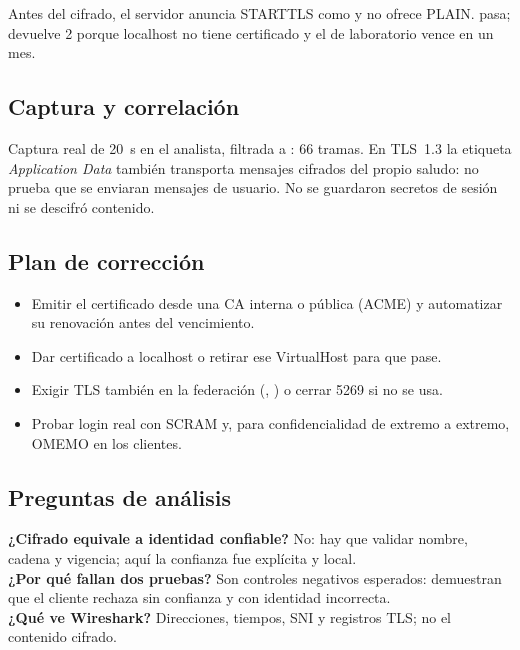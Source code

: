 Antes del cifrado, el servidor anuncia STARTTLS como  y no ofrece PLAIN.  pasa;  devuelve 2 porque localhost no tiene certificado y el de laboratorio vence en un mes.

\subsection{Captura y correlación}
Captura real de 20~s en el analista, filtrada a : 66 tramas.
En TLS~1.3 la etiqueta \emph{Application Data} también transporta mensajes cifrados del propio saludo: no prueba que se enviaran mensajes de usuario. No se guardaron secretos de sesión ni se descifró contenido.

\subsection{Plan de corrección}
\begin{itemize}
\item Emitir el certificado desde una CA interna o pública (ACME) y automatizar su renovación antes del vencimiento.
\item Dar certificado a localhost o retirar ese VirtualHost para que  pase.
\item Exigir TLS también en la federación (, ) o cerrar 5269 si no se usa.
\item Probar login real con SCRAM y, para confidencialidad de extremo a extremo, OMEMO en los clientes.
\end{itemize}

\subsection{Preguntas de análisis}
\textbf{¿Cifrado equivale a identidad confiable?} No: hay que validar nombre, cadena y vigencia; aquí la confianza fue explícita y local.\\
\textbf{¿Por qué fallan dos pruebas?} Son controles negativos esperados: demuestran que el cliente rechaza sin confianza y con identidad incorrecta.\\
\textbf{¿Qué ve Wireshark?} Direcciones, tiempos, SNI y registros TLS; no el contenido cifrado.
